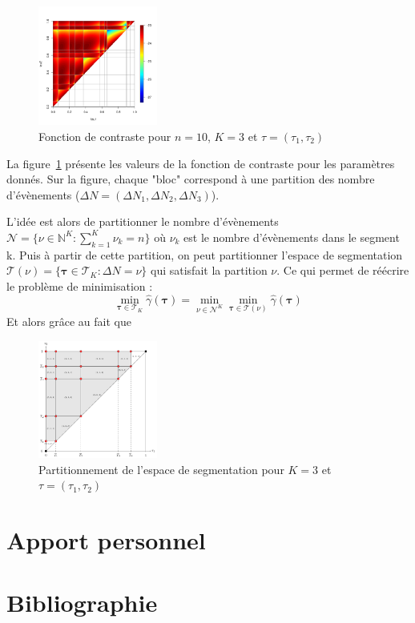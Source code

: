 \documentclass[a4paper,10pt]{article}\usepackage[]{graphicx}\usepackage[]{xcolor}
\newcommand{\segspace}{\mathcal{T}_K}
\newcommand{\N}{\mathbb{N}}
\begin{document}
\begin{figure}
    \centering
    \includegraphics[width=0.35\textwidth]{contrast-function}
    \caption{Fonction de contraste pour $n=10$, $K=3$ et $\tau = (\tau_1,\tau_2)$}
    \label{fig:contrast-function}
\end{figure}

La figure~\ref{fig:contrast-function} présente les valeurs de la fonction de 
contraste pour les paramètres donnés. Sur la figure, chaque "bloc" correspond à
une partition des nombre d'évènements ($\Delta N = (\Delta N_1, \Delta N_2, 
\Delta N_3)$). 

L'idée est alors de partitionner le nombre d'évènements  $\mathcal{N} = 
\bigl\{ \nu \in \N^K : \sum_{k=1}^K \nu_k = n \bigr\}$ où $\nu_k$ est le nombre
d'évènements dans le segment k. Puis à partir de cette partition, on peut 
partitionner l'espace de segmentation $\mathcal{T}(\nu) = 
\bigl\{ \bm \tau \in \segspace : \Delta N = \nu \bigr\}$ qui satisfait la 
partition $\nu$. Ce qui permet de réécrire le problème de minimisation :
$$\min_{\bm{\tau}\in\segspace} \widehat \gamma (\bm{\tau}) = \min_{\nu \in 
\mathcal{N}^K} \min_{\bm{\tau}\in\mathcal{T}(\nu)} \widehat \gamma (\bm{\tau})$$
Et alors grâce au fait que

\begin{figure}
    \centering
    \includegraphics[width=0.35\textwidth]{space-partitioning}
    \caption{Partitionnement de l'espace de segmentation pour $K=3$ et $\tau = (\tau_1,\tau_2)$}
    \label{fig:space-partitioning}
\end{figure}

\section{Apport personnel}






\section*{Bibliographie}

\printbibliography
\nocite{*}
\end{document}
